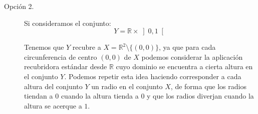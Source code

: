 \documentclass[12pt]{article}
\begin{document}
\begin{ejercicio}
\begin{enumerate}[label=\alph*)]
\begin{description}
                    \item[Opción 2.] Si consideramos el conjunto:
                    \begin{equation*}
                        Y = \mathbb{R} \times \left]0,1\right[
                    \end{equation*}
                    \begin{figure}[H]
                        \centering
                    \end{figure}
                    \noindent
                    Tenemos que $Y$ recubre a $X=\mathbb{R}^2\setminus\{(0,0)\}$, ya que para cada circunferencia de centro $(0,0)$  de $X$ podemos considerar la aplicación recubridora estándar desde $\mathbb{R}$ cuyo dominio se encuentra a cierta altura en el conjunto $Y$. Podemos repetir esta idea haciendo corresponder a cada altura del conjunto $Y$ un radio en el conjunto $X$, de forma que los radios tiendan a $0$ cuando la altura tienda a $0$ y que los radios diverjan cuando la altura se acerque a $1$.
                    \begin{figure}[H]
                        \centering
\end{figure}
\end{description}
\end{enumerate}
\end{ejercicio}
\end{document}

